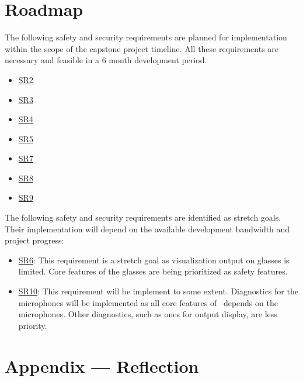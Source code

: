 \documentclass{article}
\begin{document}
\section{Roadmap}

The following safety and security requirements are planned for implementation
within the scope of the capstone project timeline. All these requirements are
necessary and feasible in a 6 month development period.
\begin{itemize}
    \item \hyperref[SR2]{SR2}
    \item \hyperref[SR3]{SR3}
    \item \hyperref[SR4]{SR4}
    \item \hyperref[SR5]{SR5}
    \item \hyperref[SR7]{SR7}
    \item \hyperref[SR8]{SR8}
    \item \hyperref[SR9]{SR9}
\end{itemize}

The following safety and security requirements are identified as stretch goals.
Their implementation will depend on the available development bandwidth and
project progress:
\begin{itemize}
    \item \hyperref[SR6]{SR6}: This requirement is a stretch goal as
    visualization output on glasses is limited. Core features of the glasses
    are being prioritized as safety features.
    \item \hyperref[SR10]{SR10}: This requirement will be implement to some
    extent. Diagnostics for the microphones will be implemented as all core
    features of \progname~depends on the microphones. Other diagnostics, such
    as ones for output display, are less priority.
\end{itemize}

\newpage



\newpage{}

\section*{Appendix --- Reflection}
\end{document}
